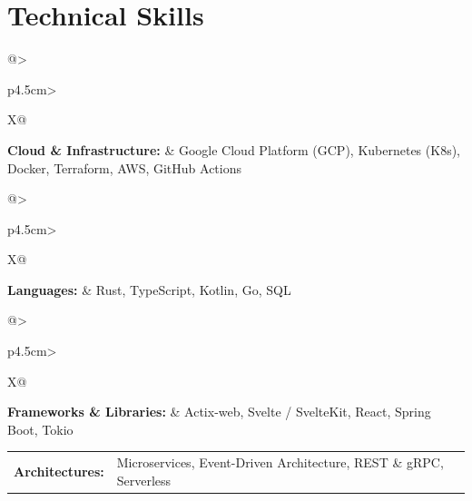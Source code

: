 \documentclass[11pt,letterpaper]{article}
\begin{document}
    \section{Technical Skills}
    
        \noindent\begin{tabularx}{\linewidth}{@{}>{\raggedright\arraybackslash}p{4.5cm}>{\raggedright\arraybackslash}X@{}}
        \color{headercolor}
        \textbf{\color{gradientstart}Cloud \& Infrastructure:} &
        \color{textcolor}
        Google Cloud Platform (GCP), Kubernetes (K8s), Docker, Terraform, AWS, GitHub Actions
        \end{tabularx}\par\vspace{3pt}
    
        \noindent\begin{tabularx}{\linewidth}{@{}>{\raggedright\arraybackslash}p{4.5cm}>{\raggedright\arraybackslash}X@{}}
        \color{headercolor}
        \textbf{\color{gradientstart}Languages:} &
        \color{textcolor}
        Rust, TypeScript, Kotlin, Go, SQL
        \end{tabularx}\par\vspace{3pt}
    
        \noindent\begin{tabularx}{\linewidth}{@{}>{\raggedright\arraybackslash}p{4.5cm}>{\raggedright\arraybackslash}X@{}}
        \color{headercolor}
        \textbf{\color{gradientstart}Frameworks \& Libraries:} &
        \color{textcolor}
        Actix-web, Svelte / SvelteKit, React, Spring Boot, Tokio
        \end{tabularx}\par\vspace{3pt}
    
        \noindent\begin{tabularx}{\linewidth}{@{}>{\raggedright\arraybackslash}p{4.5cm}>{\raggedright\arraybackslash}X@{}}
        \color{headercolor}
        \textbf{\color{gradientstart}Architectures:} &
        \color{textcolor}
        Microservices, Event-Driven Architecture, REST \& gRPC, Serverless
        \end{tabularx}\par\vspace{3pt}
    
\end{document}
